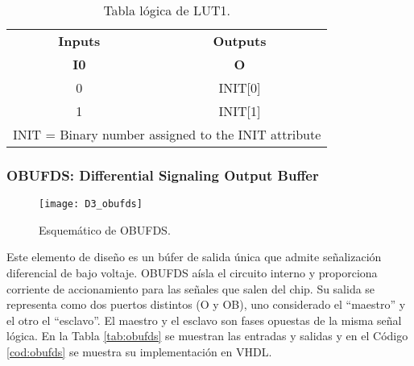                 \begin{table}[htbp]
                    \centering
                    \caption{Tabla lógica de LUT1.}
                    \begin{tabular}{|cc|}
                        \hline
                        \multicolumn{1}{|c|}{\textbf{Inputs}} & \textbf{Outputs} \\ 
                        \multicolumn{1}{|c|}{\textbf{I0}} & \textbf{O} \\ 
                        \hline 
                        \multicolumn{1}{|c|}{0} & INIT[0] \\ \hline
                        \multicolumn{1}{|c|}{1} & INIT[1] \\ \hline
                        \multicolumn{2}{|c|}{INIT = Binary number assigned to the INIT attribute} \\ 
                        \hline
                    \end{tabular}
                    \label{tab:lut1}
                \end{table}	
	
                \vspace{0.4cm}
                

            \subsubsection{OBUFDS: Differential Signaling Output Buffer}

                \begin{figure}[hbtp]
                    \caption{Esquemático de OBUFDS.}
                    \centering
                    \texttt{[image: D3\_obufds]}
                    \label{fig:D3_obufds}
                \end{figure}	

                Este elemento de diseño es un búfer de salida única que admite señalización diferencial de bajo voltaje. OBUFDS aísla el circuito interno y proporciona corriente de accionamiento para las señales que salen del chip. Su salida se representa como dos puertos distintos (O y OB), uno considerado el ``maestro'' y el otro el ``esclavo''. El maestro y el esclavo son fases opuestas de la misma señal lógica.  En la Tabla \ref{tab:obufds} se muestran las entradas y salidas y en el Código \ref{cod:obufds} se muestra su implementación en VHDL.
                
